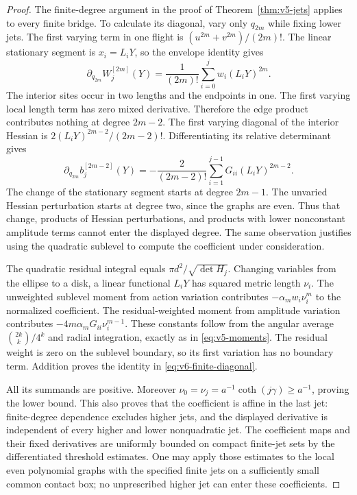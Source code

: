 \begin{proof}
The finite-degree argument in the proof of Theorem~\ref{thm:v5-jets}
applies to every finite bridge. To calculate its diagonal, vary only
$q_{2m}$ while fixing lower jets. The first varying term in one flight
is $(u^{2m}+v^{2m})/(2m)!$. The linear stationary segment is $x_i=L_iY$,
so the envelope identity gives
\[
 \partial_{q_{2m}}W_j^{[2m]}(Y)
                   =\frac1{(2m)!}\sum_{i=0}^j w_i(L_iY)^{2m}.
\]
The interior sites occur in two lengths and the endpoints in one.
The first varying local length term has zero mixed derivative.
Therefore the edge product contributes nothing at degree $2m-2$.
The first varying diagonal of the interior Hessian is
$2(L_iY)^{2m-2}/(2m-2)!$. Differentiating its relative determinant gives
\[
 \partial_{q_{2m}}b_j^{[2m-2]}(Y)
            =-\frac2{(2m-2)!}\sum_{i=1}^{j-1}G_{ii}(L_iY)^{2m-2}.
\]
The change of the stationary segment starts at degree $2m-1$.
The unvaried Hessian perturbation starts at degree two, since the graphs
are even. Thus that change, products of Hessian perturbations, and
products with lower nonconstant amplitude terms cannot enter the
displayed degree. The same observation justifies using the quadratic
sublevel to compute the coefficient under consideration.

The quadratic residual integral equals
$\pi d^2/\sqrt{\det H_j}$. Changing variables from the ellipse to a
disk, a linear functional $L_iY$ has squared metric length $\nu_i$.
The unweighted sublevel moment from action variation contributes
$-\alpha_m w_i\nu_i^m$ to the normalized coefficient. The
residual-weighted moment from amplitude variation contributes
$-4m\alpha_mG_{ii}\nu_i^{m-1}$. These constants follow from the
angular average $\binom{2k}{k}/4^k$ and radial integration, exactly as
in \eqref{eq:v5-moments}. The residual weight is zero on the sublevel
boundary, so its first variation has no boundary term. Addition proves
the identity in \eqref{eq:v6-finite-diagonal}.

All its summands are positive. Moreover
$\nu_0=\nu_j=a^{-1}\coth(j\gamma)\ge a^{-1}$, proving the lower bound.
This also proves that the coefficient is affine in the last jet:
finite-degree dependence excludes higher jets, and the displayed
derivative is independent of every higher and lower nonquadratic jet.
The coefficient maps and their fixed derivatives are uniformly bounded
on compact finite-jet sets by the differentiated threshold estimates.
One may apply those estimates to the local even polynomial graphs with
the specified finite jets on a sufficiently small common contact box;
no unprescribed higher jet can enter these coefficients.


\end{proof}
